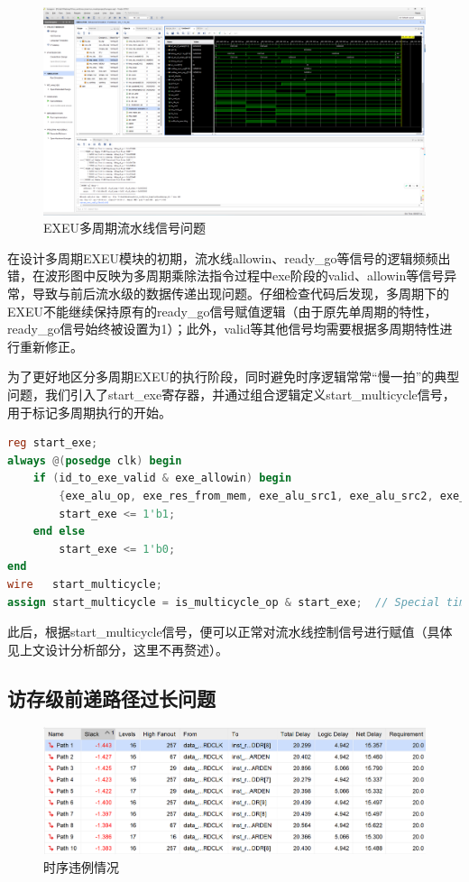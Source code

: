 \documentclass[11pt]{article}
\begin{document}
\begin{figure}[H]
  \centering
  \includegraphics[width=\textwidth]{fig/exeu_multicycle_error.png}
  \caption{EXEU多周期流水线信号问题}
  \label{fig:exeu_multicycle_error}
\end{figure}

在设计多周期EXEU模块的初期，流水线allowin、ready\_go等信号的逻辑频频出错，在波形图中反映为多周期乘除法指令过程中exe阶段的valid、allowin等信号异常，导致与前后流水级的数据传递出现问题。仔细检查代码后发现，多周期下的EXEU不能继续保持原有的ready\_go信号赋值逻辑（由于原先单周期的特性，ready\_go信号始终被设置为1）；此外，valid等其他信号均需要根据多周期特性进行重新修正。

为了更好地区分多周期EXEU的执行阶段，同时避免时序逻辑常常“慢一拍”的典型问题，我们引入了start\_exe寄存器，并通过组合逻辑定义start\_multicycle信号，用于标记多周期执行的开始。

\begin{lstlisting}[language=verilog]
reg start_exe;
always @(posedge clk) begin
    if (id_to_exe_valid & exe_allowin) begin
        {exe_alu_op, exe_res_from_mem, exe_alu_src1, exe_alu_src2, exe_mem_op, exe_rf_we, exe_rf_waddr, exe_rkd_value, exe_pc} <= id_to_exe_zip;
        start_exe <= 1'b1;
    end else
        start_exe <= 1'b0;
end
wire   start_multicycle;
assign start_multicycle = is_multicycle_op & start_exe;  // Special time stamp
\end{lstlisting}

此后，根据start\_multicycle信号，便可以正常对流水线控制信号进行赋值（具体见上文设计分析部分，这里不再赘述）。

\subsection{访存级前递路径过长问题}

\begin{figure}[H]
  \centering
  \includegraphics[width=\textwidth]{fig/timing_violation.png}
  \caption{时序违例情况}
  \label{fig:timing_violation}
\end{figure}
\end{document}
